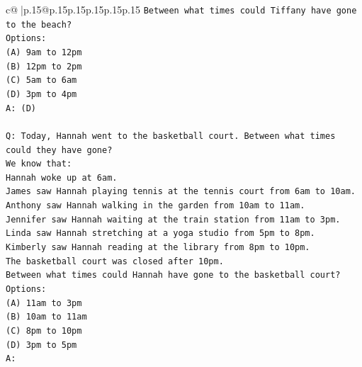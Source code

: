 \documentclass{article}
\begin{document}
{\begin{supertabular}{c@{$\;$}|p{.15\linewidth}@{}p{.15\linewidth}p{.15\linewidth}p{.15\linewidth}p{.15\linewidth}p{.15\linewidth}}
{{{\texttt{Between what times could Tiffany have gone to the beach?} \\
\texttt{Options:} \\
\texttt{(A) 9am to 12pm} \\
\texttt{(B) 12pm to 2pm} \\
\texttt{(C) 5am to 6am} \\
\texttt{(D) 3pm to 4pm} \\
\texttt{A: (D)} \\
\\ 
\texttt{Q: Today, Hannah went to the basketball court. Between what times could they have gone?} \\
\texttt{We know that:} \\
\texttt{Hannah woke up at 6am.} \\
\texttt{James saw Hannah playing tennis at the tennis court from 6am to 10am.} \\
\texttt{Anthony saw Hannah walking in the garden from 10am to 11am.} \\
\texttt{Jennifer saw Hannah waiting at the train station from 11am to 3pm.} \\
\texttt{Linda saw Hannah stretching at a yoga studio from 5pm to 8pm.} \\
\texttt{Kimberly saw Hannah reading at the library from 8pm to 10pm.} \\
\texttt{The basketball court was closed after 10pm.} \\
\texttt{Between what times could Hannah have gone to the basketball court?} \\
\texttt{Options:} \\
\texttt{(A) 11am to 3pm} \\
\texttt{(B) 10am to 11am} \\
\texttt{(C) 8pm to 10pm} \\
\texttt{(D) 3pm to 5pm} \\
\texttt{A:} \\
            }
        }
    }
     \\ \\


\end{supertabular}}
\end{document}
